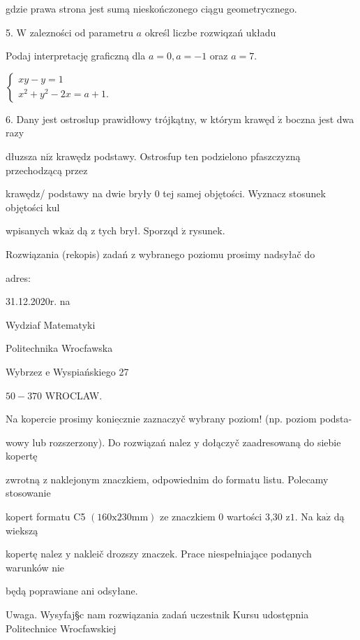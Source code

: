 \documentclass[a4paper,12pt]{article}
\begin{document}
gdzie prawa strona jest sumą nieskończonego ciągu geometrycznego.

5. $\mathrm{W}$ zalezności od parametru $a$ określ liczbe rozwiqzań układu

Podaj interpretację graficzną dla $a=0, a=-1$ oraz $a=7.$

$\left\{\begin{array}{l}
xy-y=1\\
x^{2}+y^{2}-2x=a+1.
\end{array}\right.$

6. Dany jest ostroslup prawidłowy trójkątny, $\mathrm{w}$ którym krawęd $\acute{\mathrm{z}}$ boczna jest dwa razy

dłuzsza $\mathrm{n}\mathrm{i}\dot{\mathrm{z}}$ krawędz$\acute{}$ podstawy. Ostrosfup ten podzielono pfaszczyzną przechodzącą przez

krawędz/ podstawy na dwie bryły $0$ tej samej objętości. Wyznacz stosunek objętości kul

wpisanych $\mathrm{w}\mathrm{k}\mathrm{a}\dot{\mathrm{z}}$ dą $\mathrm{z}$ tych brył. Sporzqd $\acute{\mathrm{z}}$ rysunek.

Rozwiązania (rekopis) zadań z wybranego poziomu prosimy nadsyłač do

adres:

31.12.2020r. na

Wydziaf Matematyki

Politechnika Wrocfawska

Wybrzez $\mathrm{e}$ Wyspiańskiego 27

$50-370$ WROCLAW.

Na kopercie prosimy $\underline{\mathrm{k}\mathrm{o}\mathrm{n}\mathrm{i}\mathrm{e}\mathrm{c}\mathrm{z}\mathrm{n}\mathrm{i}\mathrm{e}}$ zaznaczyč wybrany poziom! (np. poziom podsta-

wowy lub rozszerzony). Do rozwiązań nalez $\mathrm{y}$ dołączyč zaadresowaną do siebie kopertę

zwrotną $\mathrm{z}$ naklejonym znaczkiem, odpowiednim do formatu listu. Polecamy stosowanie

kopert formatu C5 $(160\mathrm{x}230\mathrm{m}\mathrm{m})$ ze znaczkiem $0$ wartości 3,30 $\mathrm{z}1$. Na $\mathrm{k}\mathrm{a}\dot{\mathrm{z}}$ dą wiekszą

kopertę nalez $\mathrm{y}$ nakleič drozszy znaczek. Prace niespełniające podanych warunków nie

będą poprawiane ani odsyłane.

Uwaga. Wysyfaj\S c nam rozwiązania zadań uczestnik Kursu udostępnia Politechnice Wrocfawskiej
\end{document}
